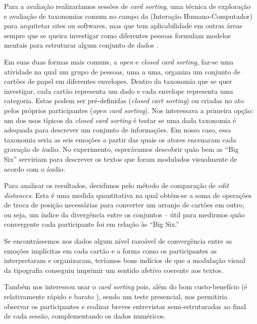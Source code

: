 \documentclass[a4paper]{tufte-handout}
\newcommand{\textls}[2][5]{%
    \begingroup\addfontfeatures{LetterSpace=#1}#2\endgroup
  }
\renewcommand{\smallcapsspacing}[1]{\textls[10]{#1}}
\renewcommand{\textsc}[1]{\smallcapsspacing{\textsmallcaps{#1}}}
\begin{document}
Para a avaliação realizaríamos sessões de \textit{card sorting}, uma técnica de exploração e avaliação de taxonomias comum no campo da \textsc{ihc} (Interação Humano-Computador) para arquitetar sites ou softwares, mas que tem aplicabilidade em outras áreas sempre que se queira investigar como diferentes pessoas formulam modelos mentais para estruturar algum conjunto de dados \citep{about_cardsorting}.

Em suas duas formas mais comuns, a \textit{open} e \textit{closed card sorting}, faz-se uma atividade na qual um grupo de pessoas, uma a uma, organiza um conjunto de cartões de papel em diferentes envelopes. Dentro da taxonomia que se quer investigar, cada cartão representa um dado e cada envelope representa uma categoria. Estas podem ser pré-definidas (\textit{closed cart sorting}) ou criadas no ato pelos próprios participantes (\textit{open card sorting}). Nos interessava a primeira opção: um dos usos típicos da \textit{closed card sorting} é testar se uma dada taxonomia é adequada para descrever um conjunto de informações. Em nosso caso, essa taxonomia seria as seis emoções a partir das quais os atores encenaram cada gravação de áudio. No experimento, esperávamos descobrir quão bem as ``Big Six'' serviriam para descrever os textos que foram modulados visualmente de acordo com o áudio.

Para analisar os resultados, decidimos pelo método de comparação de \textit{edit distances}. Esta é uma medida quantitativa na qual obtém-se a soma de operações de troca de posição necessárias para converter um arranjo de cartões em outro, ou seja, um índice da divergência entre os conjuntos -- útil para medirmos quão convergente cada participante foi em relação às ``Big Six.'' \citep{nawaz2012}

Se encontrássemos nos dados algum nível razoável de convergência entre as emoções implícitas em cada cartão e a forma como os participantes as interpretaram e organizaram, teríamos bons indícios de que a modulação visual da tipografia conseguiu imprimir um sentido afetivo coerente aos textos.

Também nos interessou usar o \textit{card sorting} pois, além do bom custo-benefício (é relativamente rápido e barato \citep{goodman2006card}), sendo um teste presencial, nos permitiria observar os participantes e realizar breves entrevistas semi-estruturadas ao final de cada sessão, complementando os dados numéricos.
\end{document}
